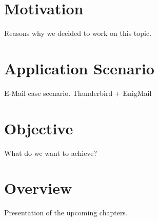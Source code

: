 
\section{Motivation}

Reasons why we decided to work on this topic.

\section {Application Scenario}

E-Mail case scenario.
Thunderbird + EnigMail

\section{Objective}

What do we want to achieve?

\section{Overview}

Presentation of the upcoming chapters.